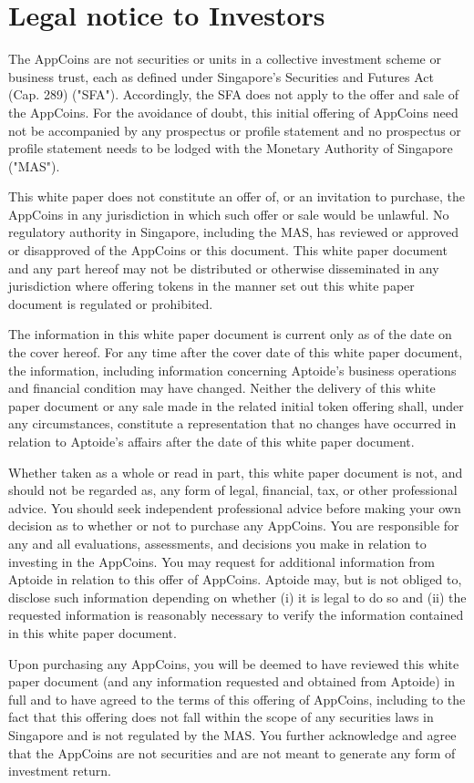 \section*{Legal notice to Investors}
 
The AppCoins are not securities or units in a collective investment scheme or business trust, each as defined under Singapore's Securities and Futures Act (Cap. 289) ("SFA"). Accordingly, the SFA does not apply to the offer and sale of the AppCoins. For the avoidance of doubt, this initial offering of AppCoins need not be accompanied by any prospectus or profile statement and no prospectus or profile statement needs to be lodged with the Monetary Authority of Singapore ("MAS").

\medskip

This white paper does not constitute an offer of, or an invitation to purchase, the AppCoins in any jurisdiction in which such offer or sale would be unlawful. No regulatory authority in Singapore, including the MAS, has reviewed or approved or disapproved of the AppCoins or this document. This white paper document and any part hereof may not be distributed or otherwise disseminated in any jurisdiction where offering tokens in the manner set out this white paper document is regulated or prohibited.

\medskip

The information in this white paper document is current only as of the date on the cover hereof. For any time after the cover date of this white paper document, the information, including information concerning Aptoide's business operations and financial condition may have changed. Neither the delivery of this white paper document or any sale made in the related initial token offering shall, under any circumstances, constitute a representation that no changes have occurred in relation to Aptoide's affairs after the date of this white paper document.

\medskip

Whether taken as a whole or read in part, this white paper document is not, and should not be regarded as, any form of legal, financial, tax, or other professional advice. You should seek independent professional advice before making your own decision as to whether or not to purchase any AppCoins. You are responsible for any and all evaluations, assessments, and decisions you make in relation to investing in the AppCoins. You may request for additional information from Aptoide in relation to this offer of AppCoins. Aptoide may, but is not obliged to, disclose such information depending on whether (i) it is legal to do so and (ii) the requested information is reasonably necessary to verify the information contained in this white paper document.

\medskip

Upon purchasing any AppCoins, you will be deemed to have reviewed this white paper document (and any information requested and obtained from Aptoide) in full and to have agreed to the terms of this offering of AppCoins, including to the fact that this offering does not fall within the scope of any securities laws in Singapore and is not regulated by the MAS. You further acknowledge and agree that the AppCoins are not securities and are not meant to generate any form of investment return.